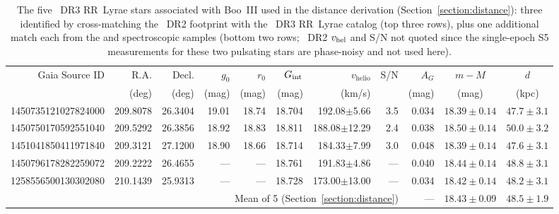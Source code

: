 \begin{table}[ht]
\centering
\caption{The five \gaia\ DR3 RR~Lyrae stars associated with Boo~III used in the distance derivation (Section~\ref{section:distance}): three identified by cross-matching the \SSSSS\ DR2 footprint with the \gaia\ DR3 RR~Lyrae catalog (top three rows), plus one additional match each from the \citet{Carlin2018} and \citet{Geha2026} spectroscopic samples (bottom two rows; \SSSSS\ DR2 $v_{\rm hel}$ and S/N not quoted since the single-epoch S5 measurements for these two pulsating stars are phase-noisy and not used here). \label{tab:rrl_distances}}
\footnotesize
\setlength{\tabcolsep}{3pt}
\begin{tabular}{rrrrrrrrrcc}
\hline\hline
Gaia Source ID & R.A. & Decl. & $g_0$ & $r_0$ & $G_{\rm int}$ & $v_\mathrm{helio}$ & S/N & $A_G$ & $m-M$ & $d$ \\
& (deg) & (deg) & (mag) & (mag) & (mag) & (km/s) &  & (mag) & (mag) & (kpc) \\
\hline
1450735121027824000 & 209.8078 & 26.3404 & 19.01 & 18.74 & 18.704 & 192.08$\pm$5.66 & 3.5 & 0.034 & $18.39 \pm 0.14$ & $47.7 \pm 3.1$ \\
1450750170592551040 & 209.5292 & 26.3856 & 18.92 & 18.83 & 18.811 & 188.08$\pm$12.29 & 2.4 & 0.038 & $18.50 \pm 0.14$ & $50.0 \pm 3.2$ \\
1451041850411971840 & 209.3121 & 27.1200 & 18.90 & 18.66 & 18.714 & 184.33$\pm$7.99 & 3.0 & 0.048 & $18.39 \pm 0.14$ & $47.6 \pm 3.1$ \\
1450796178282259072\tablenotemark{a} & 209.2222 & 26.4655 & --- & --- & 18.761 & 191.83$\pm$4.86 & --- & 0.040 & $18.44 \pm 0.14$ & $48.8 \pm 3.1$ \\
1258556500130302080\tablenotemark{b} & 210.1439 & 25.9313 & --- & --- & 18.728 & 173.00$\pm$13.00 & --- & 0.034 & $18.42 \pm 0.14$ & $48.2 \pm 3.1$ \\
\hline
\multicolumn{8}{r}{Mean of 5 (Section~\ref{section:distance})} & --- & $18.43 \pm 0.09$ & $48.5 \pm 1.9$ \\
\hline
\end{tabular}

\vspace{1ex}
\end{table}
